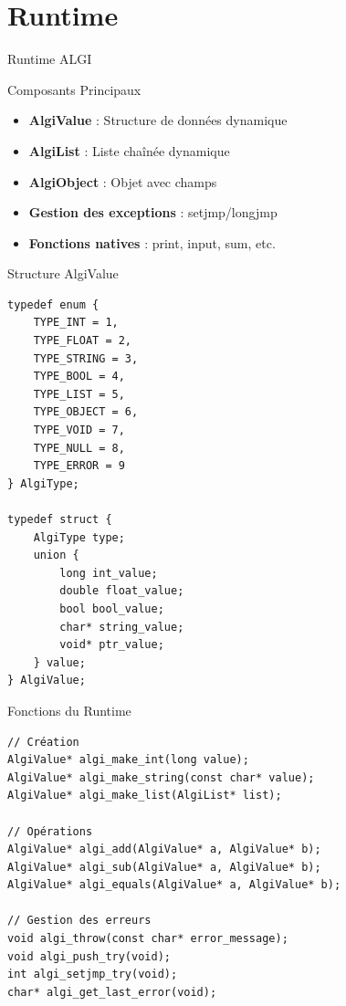 \documentclass[10pt]{beamer}
\begin{document}
\section{Runtime}

\begin{frame}{Runtime ALGI}
    \begin{block}{Composants Principaux}
        \begin{itemize}
            \item \textbf{AlgiValue} : Structure de données dynamique
            \item \textbf{AlgiList} : Liste chaînée dynamique
            \item \textbf{AlgiObject} : Objet avec champs
            \item \textbf{Gestion des exceptions} : setjmp/longjmp
            \item \textbf{Fonctions natives} : print, input, sum, etc.
        \end{itemize}
    \end{block}
\end{frame}

\begin{frame}[fragile]{Structure AlgiValue}
    \begin{lstlisting}[style=algi-style, caption={runtime.h}]
typedef enum {
    TYPE_INT = 1,
    TYPE_FLOAT = 2,
    TYPE_STRING = 3,
    TYPE_BOOL = 4,
    TYPE_LIST = 5,
    TYPE_OBJECT = 6,
    TYPE_VOID = 7,
    TYPE_NULL = 8,
    TYPE_ERROR = 9
} AlgiType;

typedef struct {
    AlgiType type;
    union {
        long int_value;
        double float_value;
        bool bool_value;
        char* string_value;
        void* ptr_value;
    } value;
} AlgiValue;
\end{lstlisting}
\end{frame}

\begin{frame}[fragile]{Fonctions du Runtime}
    \begin{lstlisting}[style=algi-style, caption={Exemples de fonctions}]
// Création
AlgiValue* algi_make_int(long value);
AlgiValue* algi_make_string(const char* value);
AlgiValue* algi_make_list(AlgiList* list);

// Opérations
AlgiValue* algi_add(AlgiValue* a, AlgiValue* b);
AlgiValue* algi_sub(AlgiValue* a, AlgiValue* b);
AlgiValue* algi_equals(AlgiValue* a, AlgiValue* b);

// Gestion des erreurs
void algi_throw(const char* error_message);
void algi_push_try(void);
int algi_setjmp_try(void);
char* algi_get_last_error(void);
\end{lstlisting}
\end{frame}
\end{document}
